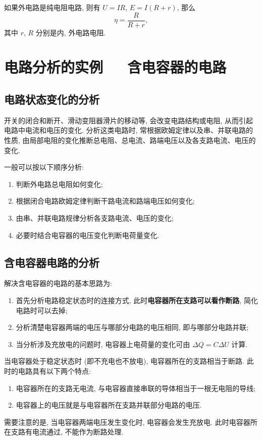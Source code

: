 \documentclass[UTF8,openany,fontset=fandol]{ctexbook}
\theoremstyle{chinesetextbook}
\newcommand{\bre}{\ \ \ }
\begin{document}
如果外电路是纯电阻电路, 则有 $U=IR$, $E=I(R+r)$, 那么
\[
\eta=\frac{R}{R+r},
\]
其中 $r$, $R$ 分别是内, 外电路电阻.
\section{电路分析的实例\bre 含电容器的电路}
\subsection{电路状态变化的分析}
开关的闭合和断开、滑动变阻器滑片的移动等, 会改变电路结构或电阻, 从而引起电路中电流和电压的变化. 分析这类电路时, 常根据欧姆定律以及串、并联电路的性质, 由局部电阻的变化推断总电阻、总电流、路端电压以及各支路电流、电压的变化.

一般可以按以下顺序分析:
\begin{enumerate}
\item 判断外电路总电阻如何变化;
\item 根据闭合电路欧姆定律判断干路电流和路端电压如何变化;
\item 由串、并联电路规律分析各支路电流、电压的变化;
\item 必要时结合电容器的电压变化判断电荷量变化.
\end{enumerate}
\subsection{含电容器电路的分析}
解决含电容器的电路的基本思路为:
\begin{enumerate}
\item 首先分析电路稳定状态时的连接方式, 此时\textbf{电容器所在支路可以看作断路}, 简化电路时可以去掉;
\item 分析清楚电容器两端的电压与哪部分电路的电压相同, 即与哪部分电路并联;
\item 当分析涉及充放电的问题时, 电容器上电荷量的变化可由 $\Delta Q=C\Delta U$ 计算.
\end{enumerate}

当电容器处于稳定状态时 (即不充电也不放电), 电容器所在的支路相当于断路. 此时的电路具有以下两个特点:
\begin{enumerate}
\item 电容器所在的支路无电流, 与电容器直接串联的导体相当于一根无电阻的导线;
\item 电容器上的电压就是与电容器所在支路并联部分电路的电压.
\end{enumerate}

需要注意的是, 当电容器两端电压发生变化时, 电容器会发生充放电. 此时电容器所在支路有电流通过, 不能作为断路处理.
\end{document}
